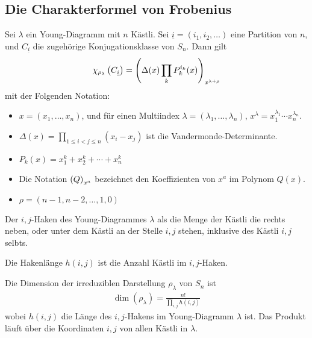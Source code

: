 \subsection{Die Charakterformel von Frobenius}

\begin{satz}[Frobeniusformel]
    Sei $\lambda$ ein Young-Diagramm mit $n$ Kästli. Sei $\underline{i} =
    (i_1,i_2,\dots)$ eine Partition von $n$, und $C_{\underline{i}}$ die
    zugehörige Konjugationsklasse von $S_n$. Dann gilt
    \begin{align*}
        \chi_{\rho_{\lambda}} \left( C_{\underline{i}} \right) =
        \left( \Delta (x) \prod_k P_k^{i_k} (x) \right)_{x^{\lambda + \rho}}
    \end{align*}
    mit der Folgenden Notation:
    \begin{itemize}
        \item $x = (x_1,\dots,x_n)$, und für einen Multiindex $\lambda =
            (\lambda_1,\dots,\lambda_n)$, $x^\lambda = x_1^{\lambda_1}
            \dotsb x_n^{\lambda_n}$.
        \item $\Delta(x) = \prod_{1 \leq i < j \leq n} (x_i - x_j)$ ist
            die Vandermonde-Determinante.
        \item $P_k (x) = x_1^k + x_2^k + \dotsb + x_n^k$
        \item Die Notation $\left( Q \right)_{x^a}$ bezeichnet den Koeffizienten
            von $x^a$ im Polynom $Q(x)$.
        \item $\rho = (n-1,n-2,\dots,1,0)$
    \end{itemize}
\end{satz}

\begin{definition}[Haken]
    Der $i,j$-Haken des Young-Diagrammes $\lambda$ als die Menge der Kästli
    die rechts neben, oder unter dem Kästli an der Stelle $i,j$ stehen,
    inklusive des Kästli $i,j$ selbts.
\end{definition}

\begin{definition}[Hakenlänge]
    Die Hakenlänge $h(i,j)$ ist die Anzahl Kästli im $i,j$-Haken.
\end{definition}

\begin{korollar}[Hakenlängenformel]
    Die Dimension der irreduziblen Darstellung $\rho_\lambda$ von $S_n$ ist
    \begin{align*}
        \dim (\rho_\lambda) = \frac{n!}{\prod_{i,j} h(i,j)}
    \end{align*}
    wobei $h(i,j)$ die Länge des $i,j$-Hakens im Young-Diagramm $\lambda$ ist.
    Das Produkt läuft über die Koordinaten $i,j$ von allen Kästli in $\lambda$.
\end{korollar}
